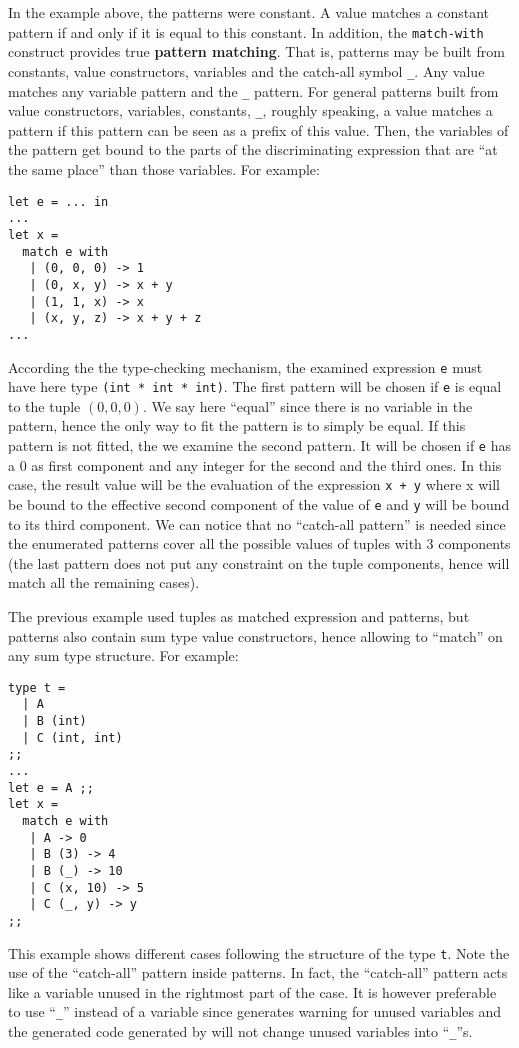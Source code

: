 \medskip In the example above, the patterns were constant. A value
matches a constant pattern if and only if it is equal to this
constant.  In addition, the
{\tt match-with} construct provides true {\bf pattern matching}. That
is, patterns may be built from constants, value constructors,
variables and the catch-all symbol {\tt \_}. Any value matches any
variable pattern and the {\tt \_} pattern. For general patterns built
from value constructors, variables, constants, {\tt \_}, roughly
speaking, a value matches a pattern if this pattern can be seen as a
prefix of this value. Then, the variables of the pattern get bound to
the parts of the discriminating expression that are ``at the same
place'' than those variables. For example:

{\scriptsize
\begin{lstlisting}
let e = ... in
...
let x =
  match e with
   | (0, 0, 0) -> 1
   | (0, x, y) -> x + y
   | (1, 1, x) -> x
   | (x, y, z) -> x + y + z
...
\end{lstlisting}
}
According the the type-checking mechanism, the examined expression
{\tt e} must have here type {\tt (int * int * int)}. The first pattern
will be chosen if {\tt e} is  equal to the tuple $(0, 0, 0)$. We
say here ``equal'' since there is no variable in the pattern, hence
the only way to fit the pattern is to simply  be equal. If this pattern
is not fitted, the we examine the second pattern. It will be chosen if
{\tt e} has a $0$ as first component and any integer for the second
and the third ones. In this case, the result value will be the
evaluation of the expression {\tt x + y} where x will be bound to the
effective second component of the value of {\tt e} and {\tt y} will be
bound to its third component. We can notice that no ``catch-all pattern''
is needed since the enumerated patterns cover all the possible values
of tuples with 3 components (the last pattern does not put
any constraint on the tuple components, hence will match all the
remaining cases).

The previous example used tuples as matched expression and patterns,
but patterns also contain sum type value constructors, hence allowing
to ``match'' on any sum type structure. For example: {\scriptsize
\begin{lstlisting}
type t =
  | A
  | B (int)
  | C (int, int)
;;
...
let e = A ;;
let x =
  match e with
   | A -> 0
   | B (3) -> 4
   | B (_) -> 10
   | C (x, 10) -> 5
   | C (_, y) -> y
;;
\end{lstlisting}
}
This example shows different cases following the structure of the type
{\tt t}. Note the use of the ``catch-all'' pattern
inside  patterns. In fact, the ``catch-all'' pattern acts like
a variable  unused in the rightmost part of the
case. It is however preferable to use ``{\tt \_}'' instead of a
variable since {\ocaml} generates warning for unused variables and the
generated {\ocaml} code generated by {\focal} will not change unused
variables into ``{\tt \_}''s.


